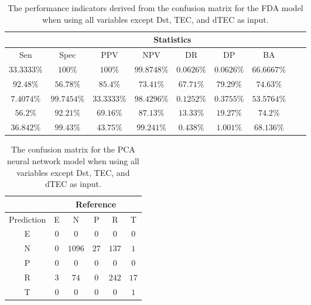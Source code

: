 \begin{table}[!ht]
	\centering
	\begin{tabular}{|c|c|c|c|c|c|c|c|c|}
		\hline
		 & \multicolumn{7}{c|}{Statistics} \\ \hline
		Sen & Spec & PPV & NPV & DR & DP & BA \\ \hline
		$33.3333\%$ & $100\%$ & $100\%$ & $99.8748\%$ & $0.0626\%$ & $0.0626\%$ & $66.6667\%$ \\ \hline
		$92.48\%$ & $56.78\%$ & $85.4\%$ & $73.41\%$ & $67.71\%$ & $79.29\%$ & $74.63\%$ \\ \hline
		$7.4074\%$ & $99.7454\%$ & $33.3333\%$ & $98.4296\%$ & $0.1252\%$ & $0.3755\%$ & $53.5764\%$ \\ \hline
		$56.2\%$ & $92.21\%$ & $69.16\%$ & $87.13\%$ & $13.33\%$ & $19.27\%$ & $74.2\%$ \\ \hline
		$36.842\%$ & $99.43\%$ & $43.75\%$ & $99.241\%$ & $0.438\%$ & $1.001\%$ & $68.136\%$ \\ \hline
	\end{tabular}
	\caption{The performance indicators derived from the confusion matrix for the FDA model when using all variables except Dst, TEC, and dTEC as input.}
	\label{tab:cs:noTEC:fda}
\end{table}

\begin{table}[!ht]
	\centering
	\begin{tabular}{|c|c|c|c|c|c|}
		\hline
		 & \multicolumn{5}{|c|}{Reference} \\ \hline
		 Prediction & E & N & P & R & T \\ \hline
		 E & $0$ & $0$ & $0$ & $0$ & $0$ \\ \hline
		 N & $0$ & $1096$ & $27$ & $137$ & $1$ \\ \hline
		 P & $0$ & $0$ & $0$ & $0$ & $0$ \\ \hline
		 R & $3$ & $74$ & $0$ & $242$ & $17$ \\ \hline
		 T & $0$ & $0$ & $0$ & $0$ & $1$ \\ \hline
	\end{tabular}
	\caption{The confusion matrix for the PCA neural network model when using all variables except Dst, TEC, and dTEC as input.}
	\label{tab:cm:noTEC:pcaNNet}
\end{table}

